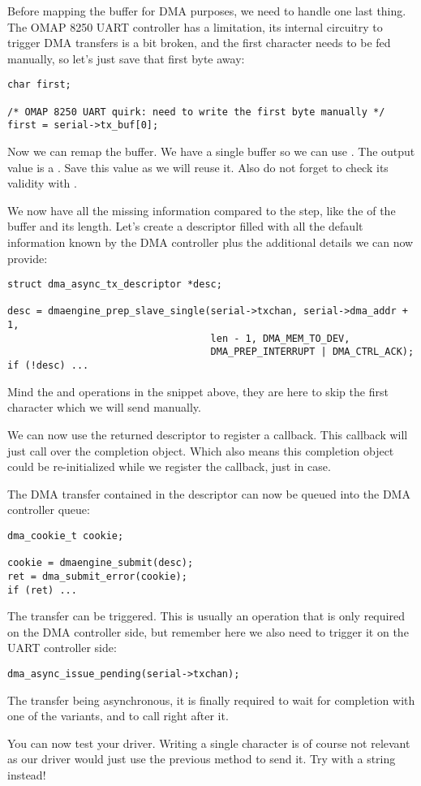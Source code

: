 Before mapping the buffer for DMA purposes, we need to handle one last
thing. The OMAP 8250 UART controller has a limitation, its internal circuitry
to trigger DMA transfers is a bit broken, and the first character needs to be
fed manually, so let's just save that first byte away:

\begin{verbatim}
char first;

/* OMAP 8250 UART quirk: need to write the first byte manually */
first = serial->tx_buf[0];
\end{verbatim}

Now we can remap the buffer. We have a single buffer so we can use
. The output value is a . Save this
value as we will reuse it. Also do not forget to check its validity with
.

We now have all the missing information compared to the 
step, like the  of the buffer and its length. Let's create a
descriptor filled with all the default information known by the DMA controller
plus the additional details we can now provide:

\begin{verbatim}
struct dma_async_tx_descriptor *desc;

desc = dmaengine_prep_slave_single(serial->txchan, serial->dma_addr + 1,
                                   len - 1, DMA_MEM_TO_DEV,
                                   DMA_PREP_INTERRUPT | DMA_CTRL_ACK);
if (!desc) ...
\end{verbatim}

Mind the  and  operations in the snippet above, they are
here to skip the first character which we will send manually.

We can now use the returned descriptor to register a callback. This callback
will just call  over the completion object. Which also means
this completion object could be re-initialized while we register the callback,
just in case.

The DMA transfer contained in the descriptor can now be queued into the DMA
controller queue:

\begin{verbatim}
dma_cookie_t cookie;

cookie = dmaengine_submit(desc);
ret = dma_submit_error(cookie);
if (ret) ...
\end{verbatim}

The transfer can be triggered. This is usually an operation that is only
required on the DMA controller side, but remember here we also need to trigger
it on the UART controller side:

\begin{verbatim}
dma_async_issue_pending(serial->txchan);
\end{verbatim}

The transfer being asynchronous, it is finally required to wait for completion
with one of the  variants, and to call
 right after it.

You can now test your driver. Writing a single character is of course not
relevant as our driver would just use the previous method to send it. Try with
a string instead!
